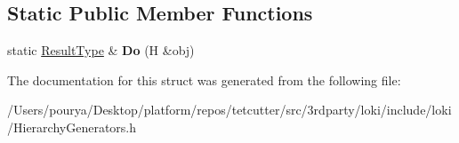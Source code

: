 \subsection*{Static Public Member Functions}
\begin{DoxyCompactItemize}
\item 
\hypertarget{structLoki_1_1FieldHelper_a80e818372ac4894ffac1b8f4846c95a5}{}static \hyperlink{structP1}{Result\+Type} \& {\bfseries Do} (H \&obj)\label{structLoki_1_1FieldHelper_a80e818372ac4894ffac1b8f4846c95a5}

\end{DoxyCompactItemize}


The documentation for this struct was generated from the following file\+:\begin{DoxyCompactItemize}
\item 
/\+Users/pourya/\+Desktop/platform/repos/tetcutter/src/3rdparty/loki/include/loki/Hierarchy\+Generators.\+h\end{DoxyCompactItemize}
